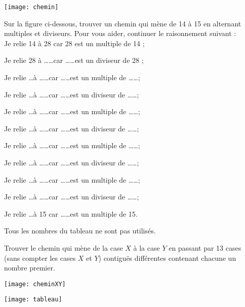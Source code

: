 \begin{exercice}
\begin{center} \texttt{[image: chemin]} \end{center}

Sur la figure ci-dessous, trouver un chemin qui mène de 14 à 15 en alternant multiples et diviseurs. Pour vous aider, continuer le raisonnement suivant : \\[1em]
Je relie 14 à 28 car 28 est un multiple de 14 ;

Je relie 28 à \ldots \ldots car \ldots \ldots est un diviseur de 28 ;

Je relie \ldots à \ldots \ldots car \ldots \ldots est un multiple de \ldots \ldots ;

Je relie \ldots à \ldots \ldots car \ldots \ldots est un diviseur de \ldots \ldots ;

Je relie \ldots à \ldots \ldots car \ldots \ldots est un multiple de \ldots \ldots ;

Je relie \ldots à \ldots \ldots car \ldots \ldots est un diviseur de \ldots \ldots ;

Je relie \ldots à \ldots \ldots car \ldots \ldots est un multiple de \ldots \ldots ;

Je relie \ldots à \ldots \ldots car \ldots \ldots est un diviseur de \ldots \ldots ;

Je relie \ldots à \ldots \ldots car \ldots \ldots est un multiple de \ldots \ldots ;

Je relie \ldots à \ldots \ldots car \ldots \ldots est un diviseur de \ldots \ldots ;

Je relie \ldots à 15 car \ldots \ldots est un multiple de 15.

Tous les nombres du tableau ne sont pas utilisés.

\end{exercice}



\newpage





\begin{exercice}
Trouver le chemin qui mène de la case $X$ à la case $Y$ en passant par 13 cases (sans compter les cases $X$ et $Y$) contiguës différentes contenant chacune un nombre premier.

\begin{center} \texttt{[image: cheminXY]} \end{center}

\begin{center} \texttt{[image: tableau]} \end{center}
\end{exercice}


